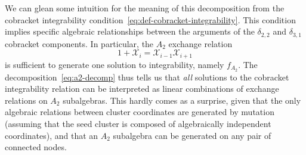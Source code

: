 \documentclass[11pt]{article}
\def\x{\mathcal{X}}
\begin{document}
We can glean some intuition for the meaning of this decomposition from the cobracket integrability condition~\eqref{eq:def-cobracket-integrability}. This condition implies specific algebraic relationships between the arguments of the $\delta_{2,2}$ and $\delta_{3,1}$ cobracket components. In particular, the $A_2$ exchange relation
\begin{equation}
	1+\x_i = \x_{i-1}\x_{i+1}
\end{equation}
is sufficient to generate one solution to integrability, namely $f_{A_2}$. The decomposition~\eqref{eq:a2-decomp} thus tells us that \emph{all} solutions to the cobracket integrability relation can be interpreted as linear combinations of exchange relations on $A_2$ subalgebras. This hardly comes as a surprise, given that the only algebraic relations between cluster coordinates are generated by mutation (assuming that the seed cluster is composed of algebraically independent coordinates), and that an $A_2$ subalgebra can be generated on any pair of connected nodes.


\end{document}
